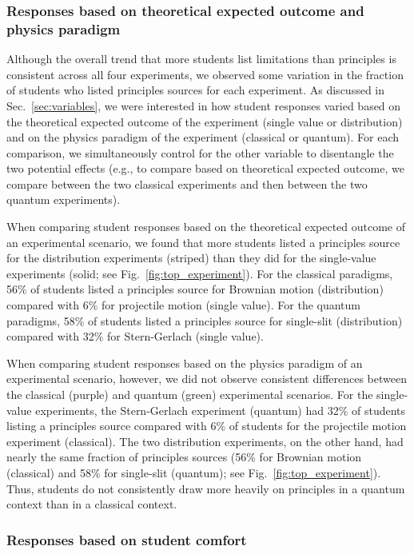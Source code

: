 \documentclass[english,aps,prstper,reprint,showpacs,longbibliography,superscriptaddress,nofootinbib]{revtex4-2}
\begin{document}
\subsubsection{Responses based on theoretical expected outcome and physics paradigm}

Although the overall trend that more students list limitations than principles is consistent across all four experiments, we observed some variation in the fraction of students who listed principles sources for each experiment. As discussed in Sec.~\ref{sec:variables}, we were interested in how student responses varied based on the theoretical expected outcome of the experiment (single value or distribution) and on the physics paradigm of the experiment (classical or quantum). For each comparison, we simultaneously control for the other variable to disentangle the two potential effects (e.g., to compare based on theoretical expected outcome, we compare between the two classical experiments and then between the two quantum experiments).

When comparing student responses based on the theoretical expected outcome of an experimental scenario, we found that more students listed a principles source for the distribution experiments (striped) than they did for the single-value experiments (solid; see Fig.~\ref{fig:top_experiment}).  For the classical paradigms, 56\% of students listed a principles source for Brownian motion (distribution) compared with 6\% for projectile motion (single value). For the quantum paradigms, 58\% of students listed a principles source for single-slit (distribution) compared with 32\% for Stern-Gerlach (single value). 

When comparing student responses based on the physics paradigm of an experimental scenario, however, we did not observe consistent differences between the classical (purple) and quantum (green) experimental scenarios. For the single-value experiments, the Stern-Gerlach experiment (quantum) had 32\% of students listing a principles source compared with 6\% of students for the projectile motion experiment (classical). The two distribution experiments, on the other hand, had nearly the same fraction of principles sources (56\% for Brownian motion (classical) and 58\% for single-slit (quantum); see Fig.~\ref{fig:top_experiment}). Thus, students do not consistently draw more heavily on principles in a quantum context than in a classical context.

\subsubsection{Responses based on student comfort}
\end{document}
